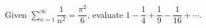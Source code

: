 Given $\sum_{n=1}^{\infty}\dfrac{1}{n^2}=\dfrac{\pi^2}{6}$, evaluate $1-\dfrac{1}{4}+\dfrac{1}{9}-\dfrac{1}{16}+\cdots$.
